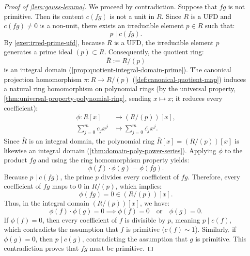 \begin{content}
\begin{proof}[Proof of \cref{lem:gauss-lemma}]
We proceed by contradiction. Suppose that $fg$ is not primitive. Then its content $c(fg)$ is not a unit in $R$.
Since $R$ is a UFD and $c(fg) \neq 0$ is a non-unit, there exists an irreducible element $p \in R$ such that:
\[
p \mid c(fg).
\]
By \cref{exer:irred-prime-ufd}, because $R$ is a UFD, the irreducible element $p$ generates a prime ideal $(p) \subset R$. Consequently, the quotient ring:
\[
\overline{R} := R / (p)
\]
is an integral domain (\cref{prop:quotient-integral-domain-prime}).
The canonical projection homomorphism $\pi \colon R \to R / (p)$ (\cref{def:canonical-quotient-map}) induces a natural ring homomorphism on polynomial rings (by the universal property, \cref{thm:universal-property-polynomial-ring}, sending $x \mapsto x$; it reduces every coefficient):
\begin{align*}
\phi \colon R[x] &\to (R/(p))[x], \\
\sum_{j=0}^m c_j x^j &\mapsto \sum_{j=0}^m \overline{c_j} x^j.
\end{align*}
Since $\overline{R}$ is an integral domain, the polynomial ring $\overline{R}[x] = (R/(p))[x]$ is likewise an integral domain (\cref{thm:domain-poly-power-series}).
Applying $\phi$ to the product $fg$ and using the ring homomorphism property yields:
\[
\phi(f) \cdot \phi(g) = \phi(fg).
\]
Because $p \mid c(fg)$, the prime $p$ divides every coefficient of $fg$. Therefore, every coefficient of $fg$ maps to $0$ in $R/(p)$, which implies:
\[
\phi(fg) = 0 \in (R/(p))[x].
\]
Thus, in the integral domain $(R/(p))[x]$, we have:
\[
\phi(f) \cdot \phi(g) = 0 \implies \phi(f) = 0 \quad \text{or} \quad \phi(g) = 0.
\]
If $\phi(f) = 0$, then every coefficient of $f$ is divisible by $p$, meaning $p \mid c(f)$, which contradicts the assumption that $f$ is primitive ($c(f) \sim 1$). Similarly, if $\phi(g) = 0$, then $p \mid c(g)$, contradicting the assumption that $g$ is primitive.
This contradiction proves that $fg$ must be primitive.
\end{proof}
\end{content}

\begin{hidden}
\end{hidden}

